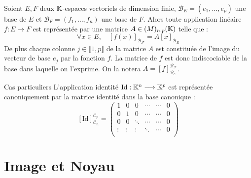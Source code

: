 \begin{theorem}
    Soient $E,F$ deux $\mathbb{K}$-espaces vectoriels de dimension finie, $ \mathcal{B}_E = (e_1, \dots, e_p)$ une base de $E$ 
    et $ \mathcal{B}_F = (f_1, \dots, f_n)$ une base de $F$. 
    Alors toute application linéaire $f : E \longrightarrow F$ est représentée par une matrice $A \in \mathcal(M)_{n,p}(\mathbb{K})$
    telle que : 
        \[ \forall x \in E, \quad \left[f(x)\right]_\mathcal{B_F} = A [x]_{ \mathcal{B}_E} \] 
    De plus chaque colonne $j \in \llbracket 1, p \rrbracket$ de la matrice $A$ est constituée de l'image 
    du vecteur de base $e_j$ par la fonction $f$. 
    La matrice de $f$ est donc indiscociable de la base dans laquelle on l'exprime. On la notera $A = [f]_{\mathcal{B_E}}^{\mathcal{B_F}}$. 
\end{theorem}

\begin{example}{Cas particuliers}
    L'application identité $ \text{Id} : \mathbb{K}^n \longrightarrow \mathbb{K}^p $ est représentée canoniquement par la matrice identité 
    dans la base canonique : 
        \[ [\text{Id}]_{\mathcal{C}_n}^{\mathcal{C}_p} = 
            \begin{pmatrix}
                1 & 0 & 0 & \cdots & \cdots & 0 \\ 
                0 & 1 & 0 & \cdots & \cdots & 0 \\ 
                0 & 0 & \ddots & \cdots & \cdots & 0 \\ 
                \vdots & \vdots & \vdots & \ddots & \cdots & 0 \\ 
            \end{pmatrix} \] 
\end{example}



\section{Image et Noyau}


